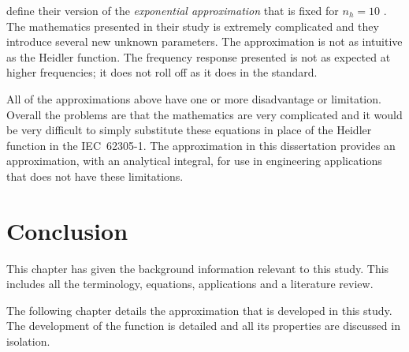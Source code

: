 \citeauthor{Vujevic2009} define their version of the \textit{exponential approximation} that is fixed for $n_h=10$ \cite{Vujevic2009,Vujevic2010a}. The mathematics presented in their study is extremely complicated and they introduce several new unknown parameters. The approximation is not as intuitive as the Heidler function. The frequency response presented is not as expected at higher frequencies; it does not roll off as it does in the standard.

All of the approximations above have one or more disadvantage or limitation. Overall the problems are that the mathematics are very complicated and it would be very difficult to simply substitute these equations in place of the Heidler function in the IEC~62305-1. The approximation in this dissertation provides an approximation, with an analytical integral, for use in engineering applications that does not have these limitations.


\section{Conclusion}
\label{sec:background_conclusion}
This chapter has given the background information relevant to this study. This includes all the terminology, equations, applications and a literature review.

The following chapter details the approximation that is developed in this study. The development of the function is detailed and all its properties are discussed in isolation.
